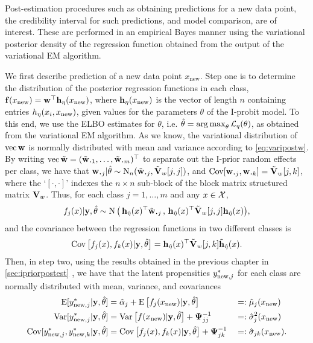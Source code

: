 Post-estimation procedures such as obtaining predictions for a new data point, the credibility interval for such predictions, and model comparison, are of interest.
These are performed in an empirical Bayes manner using the variational posterior density of the regression function obtained from the output of the variational EM algorithm.

We first describe prediction of a new data point $x_{\text{new}}$.
Step one is to determine the distribution of the posterior regression functions in each class, ${\mathbf f}(x_{\text{new}}) = {\mathbf w}^\top{\mathbf h}_\eta(x_{\text{new}})$, where ${\mathbf h}_\eta(x_{\text{new}})$ is the vector of length $n$ containing entries $h_\eta(x_i,x_{\text{new}})$, given values for the parameters $\theta$ of the I-probit model.
To this end, we use the ELBO estimates for $\theta$, i.e. $\hat\theta = \operatorname*{arg\,max}_\theta {\mathcal L}_q(\theta)$, as obtained from the variational EM algorithm.
As we know, the variational distribution of $\operatorname{vec}{\mathbf w}$ is normally distributed with mean and variance according to \cref{eq:varipostw}.
By writing $\vecc \tilde\bw = (\tilde \bw_{\bigcdot 1}, \dots, \tilde \bw_{\bigcdot m})^\top$ to separate out the I-prior random effects per class, we have that $\bw_{\bigcdot j}|\hat\theta \sim \N_n(\tilde \bw_{\bigcdot j}, \tilde\bV_w[j,j])$, and $\Cov[\bw_{\bigcdot j},\bw_{\bigcdot k}] = \tilde\bV_w[j,k]$, where the `$[\cdot,\cdot]$' indexes the $n\times n$ sub-block of the block matrix structured matrix ${\mathbf V}_w$.
Thus, for each class $j=1,\dots,m$ and any $x \in {\mathcal X}$,
\[
  f_j(x)|\by,\hat\theta \sim \N\big(\,
  \bh_{\hat\eta}(x)^\top \tilde\bw_{\bigcdot j} \, , \,
  \bh_{\hat\eta}(x)^\top\tilde\bV_w[j,j]\bh_{\hat\eta}(x)
  \big),
\]
and the covariance between the regression functions in two different classes is
\[
  \operatorname{Cov}\big[f_j(x),f_k(x)|{\mathbf y},\hat\theta \big] = 
  {\mathbf h}_{\hat\eta}(x)^\top \tilde{{\mathbf V}}_w[j,k] \tilde{{\mathbf h}}_{\hat\eta}(x).
\]
Then, in step two, using the results obtained in the previous chapter in \cref{sec:ipriorpostest} , we have that the latent propensities $y_{{\text{new}},j}^*$ for each class are normally distributed with mean, variance, and covariances
\begin{alignat*}{3}
  \operatorname{E}[y_{{\text{new}},j}^*|{\mathbf y},\hat\theta] 
  &= \hat\alpha_j + \operatorname{E} \big[ f_j(x_{\text{new}}) |{\mathbf y},\hat\theta \big] 
  &&=: \hat\mu_j(x_\text{new}) \\
  \operatorname{Var}[y_{{\text{new}},j}^*|{\mathbf y},\hat\theta] 
  &= \operatorname{Var}\big[f(x_{\text{new}})|{\mathbf y},\hat\theta \big] + {\bm\Psi}^{-1}_{jj}
  &&=: \hat\sigma_j^2(x_\text{new}) \\
  \operatorname{Cov}[y_{{\text{new}},j}^*,y_{{\text{new}},k}^*|{\mathbf y},\hat\theta]
  &= \operatorname{Cov}\big[f_j(x),f_k(x)|{\mathbf y},\hat\theta \big] + {\bm\Psi}^{-1}_{jk}
  &&=: \hat\sigma_{jk}(x_\text{new}).
\end{alignat*}

